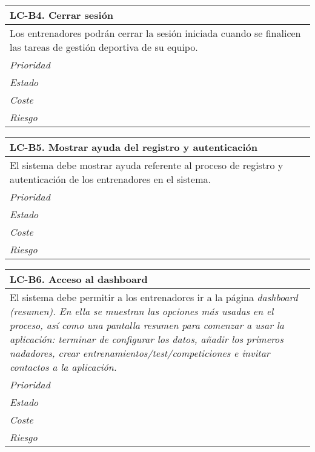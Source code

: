 	\begin{center}
		\begin{tabularx}{15cm}{|X|}
			\hline 
				\bf{LC-B4. Cerrar sesión}\\
			\hline
				Los entrenadores podrán cerrar la sesión iniciada cuando se finalicen las tareas de gestión deportiva de su equipo.\\
			\hline
				\it{Prioridad}\\
			\hline
				\it{Estado}\\
			\hline
				\it{Coste}\\
			\hline
				\it{Riesgo}\\
			\hline
		\end{tabularx}
	\end{center}
	
	\begin{center}
		\begin{tabularx}{15cm}{|X|}
			\hline 
				\bf{LC-B5. Mostrar ayuda del registro y autenticación}\\
			\hline
				El sistema debe mostrar ayuda referente al proceso de registro y autenticación de los entrenadores en el sistema.\\
			\hline
				\it{Prioridad}\\
			\hline
				\it{Estado}\\
			\hline
				\it{Coste}\\
			\hline
				\it{Riesgo}\\
			\hline
		\end{tabularx}
	\end{center}
	
	\begin{center}
		\begin{tabularx}{15cm}{|X|}
			\hline 
				\bf{LC-B6. Acceso al dashboard}\\
			\hline
				El sistema debe permitir a los entrenadores ir a la página \it{dashboard} (resumen). En ella se muestran las opciones más usadas en el proceso, así como una pantalla resumen para comenzar a usar la aplicación: terminar de configurar los datos, añadir los primeros nadadores, crear entrenamientos/test/competiciones e invitar contactos a la aplicación.\\
			\hline
				\it{Prioridad}\\
			\hline
				\it{Estado}\\
			\hline
				\it{Coste}\\
			\hline
				\it{Riesgo}\\
			\hline
		\end{tabularx}
	\end{center}
	
